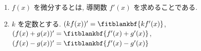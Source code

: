 \documentclass[14pt,dvipdfmx]{jsarticle}
\begin{document}
\vfill
\begin{summarybox}
  \begin{enumerate}[label=\textbf{\arabic*}, leftmargin=1.5zw, itemsep=0.2em, topsep=0.15em]
    \item $f(x)$ を微分するとは, 導関数 $f'(x)$ を求めることである.
    \item $k$ を定数とする.\enspace
          {\renewcommand{\fitblankpad}{0.6zw}%
          $(kf(x))'=\fitblankbf{kf'(x)}$,\
          $(f(x)+g(x))'=\fitblankbf{f'(x)+g'(x)}$,\
          $(f(x)-g(x))'=\fitblankbf{f'(x)-g'(x)}$}
  \end{enumerate}
\end{summarybox}

\vspace{0.05em}
\end{document}
